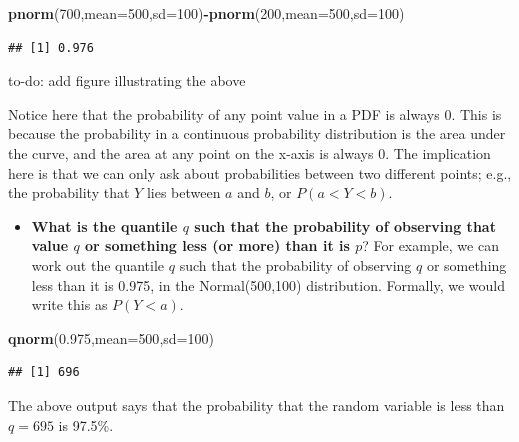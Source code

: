 \documentclass[12pt,]{krantz}
\makeatletter
\newenvironment{Shaded}{\begin{snugshade}}{\end{snugshade}}
\newcommand{\KeywordTok}[1]{\textcolor[rgb]{0.13,0.29,0.53}{\textbf{#1}}}
\newcommand{\DataTypeTok}[1]{\textcolor[rgb]{0.13,0.29,0.53}{#1}}
\newcommand{\DecValTok}[1]{\textcolor[rgb]{0.00,0.00,0.81}{#1}}
\newcommand{\FloatTok}[1]{\textcolor[rgb]{0.00,0.00,0.81}{#1}}
\newcommand{\OperatorTok}[1]{\textcolor[rgb]{0.81,0.36,0.00}{\textbf{#1}}}
\newcommand{\NormalTok}[1]{#1}
\providecommand{\tightlist}{%
  \setlength{\itemsep}{0pt}\setlength{\parskip}{0pt}}
\newenvironment{kframe}{%
\medskip{}
\setlength{\fboxsep}{.8em}
 \def\at@end@of@kframe{}%
 \ifinner\ifhmode%
  \def\at@end@of@kframe{\end{minipage}}%
  \begin{minipage}{\columnwidth}%
 \fi\fi%
 \def\FrameCommand##1{\hskip\@totalleftmargin \hskip-\fboxsep
 \colorbox{shadecolor}{##1}\hskip-\fboxsep
     \hskip-\linewidth \hskip-\@totalleftmargin \hskip\columnwidth}%
 \MakeFramed {\advance\hsize-\width
   \@totalleftmargin\z@ \linewidth\hsize
   \@setminipage}}%
 {\par\unskip\endMakeFramed%
 \at@end@of@kframe}
\newenvironment{rmdblock}[1]
  {
  \begin{itemize}
  \renewcommand{\labelitemi}{
    \raisebox{-.7\height}[0pt][0pt]{
      {\setkeys{Gin}{width=3em,keepaspectratio}\texttt{[image: images/\#1]}}
    }
  }
  \setlength{\fboxsep}{1em}
  \begin{kframe}
  \item
  }
  {
  \end{kframe}
  \end{itemize}
  }
\newenvironment{rmdnote}
  {\begin{rmdblock}{note}}
  {\end{rmdblock}}
\theoremstyle{definition}
\theoremstyle{definition}
\theoremstyle{definition}
\theoremstyle{remark}
\makeatother
\begin{document}
\begin{Shaded}
\begin{Highlighting}[]
\KeywordTok{pnorm}\NormalTok{(}\DecValTok{700}\NormalTok{,}\DataTypeTok{mean=}\DecValTok{500}\NormalTok{,}\DataTypeTok{sd=}\DecValTok{100}\NormalTok{)}\OperatorTok{-}\KeywordTok{pnorm}\NormalTok{(}\DecValTok{200}\NormalTok{,}\DataTypeTok{mean=}\DecValTok{500}\NormalTok{,}\DataTypeTok{sd=}\DecValTok{100}\NormalTok{)}
\end{Highlighting}
\end{Shaded}

\begin{verbatim}
## [1] 0.976
\end{verbatim}

\begin{rmdnote} to-do: add figure illustrating the above
\end{rmdnote}

Notice here that the probability of any point value in a PDF is always
\(0\). This is because the probability in a continuous probability
distribution is the area under the curve, and the area at any point on
the x-axis is always \(0\). The implication here is that we can only ask
about probabilities between two different points; e.g., the probability
that \(Y\) lies between \(a\) and \(b\), or \(P(a<Y<b)\).

\begin{itemize}
\tightlist
\item
  \textbf{What is the quantile \(q\) such that the probability of
  observing that value \(q\) or something less (or more) than it is
  \(p\)}? For example, we can work out the quantile \(q\) such that the
  probability of observing \(q\) or something less than it is 0.975, in
  the Normal(500,100) distribution. Formally, we would write this as
  \(P(Y<a)\).
\end{itemize}

\begin{Shaded}
\begin{Highlighting}[]
\KeywordTok{qnorm}\NormalTok{(}\FloatTok{0.975}\NormalTok{,}\DataTypeTok{mean=}\DecValTok{500}\NormalTok{,}\DataTypeTok{sd=}\DecValTok{100}\NormalTok{)}
\end{Highlighting}
\end{Shaded}

\begin{verbatim}
## [1] 696
\end{verbatim}

The above output says that the probability that the random variable is
less than \(q=695\) is 97.5\%.
\end{document}

